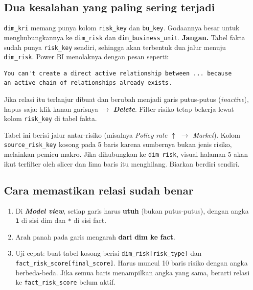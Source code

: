 \documentclass[11pt,a4paper]{article}
\newcommand{\file}[1]{\texttt{\small #1}}
\newcommand{\ui}[1]{\textbf{\textit{#1}}}
\begin{document}
\subsection{Dua kesalahan yang paling sering terjadi}

\begin{warnbox}
\file{dim\_kri} memang punya kolom \file{risk\_key} dan \file{bu\_key}. Godaannya besar untuk menghubungkannya ke \file{dim\_risk} dan \file{dim\_business\_unit}. \textbf{Jangan.} Tabel fakta sudah punya \file{risk\_key} sendiri, sehingga akan terbentuk dua jalur menuju \file{dim\_risk}. Power BI menolaknya dengan pesan seperti:
\begin{lstlisting}
You can't create a direct active relationship between ... because
an active chain of relationships already exists.
\end{lstlisting}
Jika relasi itu terlanjur dibuat dan berubah menjadi garis putus-putus (\emph{inactive}), hapus saja: klik kanan garisnya $\rightarrow$ \ui{Delete}. Filter risiko tetap bekerja lewat kolom \file{risk\_key} di tabel fakta.
\end{warnbox}

\begin{warnbox}
Tabel ini berisi jalur antar-risiko (misalnya \emph{Policy rate $\uparrow$ $\rightarrow$ Market}). Kolom \file{source\_risk\_key} kosong pada 5 baris karena sumbernya bukan jenis risiko, melainkan pemicu makro. Jika dihubungkan ke \file{dim\_risk}, visual halaman 5 akan ikut terfilter oleh slicer dan lima baris itu menghilang. Biarkan berdiri sendiri.
\end{warnbox}

\subsection{Cara memastikan relasi sudah benar}

\begin{enumerate}
\item Di \ui{Model view}, setiap garis harus \textbf{utuh} (bukan putus-putus), dengan angka \texttt{1} di sisi dim dan \texttt{*} di sisi fact.
\item Arah panah pada garis mengarah \textbf{dari dim ke fact}.
\item Uji cepat: buat tabel kosong berisi \file{dim\_risk[risk\_type]} dan \file{fact\_risk\_score[final\_score]}. Harus muncul 10 baris risiko dengan angka berbeda-beda. Jika semua baris menampilkan angka yang sama, berarti relasi ke \file{fact\_risk\_score} belum aktif.
\end{enumerate}
\end{document}
